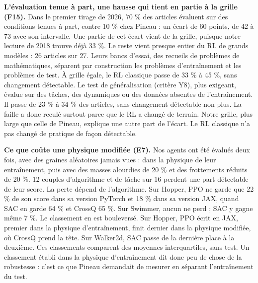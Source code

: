 \documentclass[11pt,a4paper]{article}
\begin{document}
\textbf{L'évaluation tenue à part, une hausse qui tient en partie à la
grille (F15).} Dans le premier tirage de 2026, 70 \% des articles
évaluent sur des conditions tenues à part, contre 10 \% chez Pineau : un
écart de 60 points, de 42 à 73 avec son intervalle. Une partie de cet
écart vient de la grille, puisque notre lecture de 2018 trouve déjà 33
\%. Le reste vient presque entier du RL de grands modèles : 26 articles
sur 27. Leurs bancs d'essai, des recueils de problèmes de mathématiques,
séparent par construction les problèmes d'entraînement et les problèmes
de test. À grille égale, le RL classique passe de 33 \% à 45 \%, sans
changement détectable. Le test de généralisation (critère Y8), plus
exigeant, évalue sur des tâches, des dynamiques ou des données absentes
de l'entraînement. Il passe de 23 \% à 34 \% des articles, sans
changement détectable non plus. La faille a donc reculé surtout parce
que le RL a changé de terrain. Notre grille, plus large que celle de
Pineau, explique une autre part de l'écart. Le RL classique n'a pas
changé de pratique de façon détectable.

\textbf{Ce que coûte une physique modifiée (E7).} Nos agents ont été
évalués deux fois, avec des graines aléatoires jamais vues : dans la
physique de leur entraînement, puis avec des masses alourdies de 20 \%
et des frottements réduits de 20 \%. 12 couples d'algorithme et de tâche
sur 16 perdent une part détectable de leur score. La perte dépend de
l'algorithme. Sur Hopper, PPO ne garde que 22 \% de son score dans sa
version PyTorch et 18 \% dans sa version JAX, quand SAC en garde 64 \%
et CrossQ 65 \%. Sur Swimmer, aucun ne perd ; SAC y gagne même 7 \%. Le
classement en est bouleversé. Sur Hopper, PPO écrit en JAX, premier dans
la physique d'entraînement, finit dernier dans la physique modifiée, où
CrossQ prend la tête. Sur Walker2d, SAC passe de la dernière place à la
deuxième. Ces classements comparent des moyennes interquartiles, sans
test. Un classement établi dans la physique d'entraînement dit donc peu
de chose de la robustesse : c'est ce que Pineau demandait de mesurer en
séparant l'entraînement du test.
\end{document}
